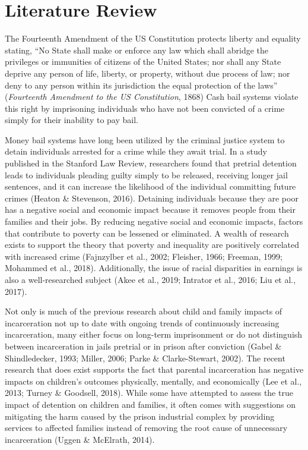\documentclass[
  letterpaper,
  DIV=11,
  numbers=noendperiod]{scrartcl}
\begin{document}
\hypertarget{literature-review}{%
\section{Literature Review}\label{literature-review}}

The Fourteenth Amendment of the US Constitution protects liberty and
equality stating, ``No State shall make or enforce any law which shall
abridge the privileges or immunities of citizens of the United States;
nor shall any State deprive any person of life, liberty, or property,
without due process of law; nor deny to any person within its
jurisdiction the equal protection of the laws'' (\emph{Fourteenth
{Amendment} to the {US Constitution}}, 1868) Cash bail systems violate
this right by imprisoning individuals who have not been convicted of a
crime simply for their inability to pay bail.

Money bail systems have long been utilized by the criminal justice
system to detain individuals arrested for a crime while they await
trial. In a study published in the Stanford Law Review, researchers
found that pretrial detention leads to individuals pleading guilty
simply to be released, receiving longer jail sentences, and it can
increase the likelihood of the individual committing future crimes
(Heaton \& Stevenson, 2016). Detaining individuals because they are poor
has a negative social and economic impact because it removes people from
their families and their jobs. By reducing negative social and economic
impacts, factors that contribute to poverty can be lessened or
eliminated. A wealth of research exists to support the theory that
poverty and inequality are positively correlated with increased crime
(Fajnzylber et al., 2002; Fleisher, 1966; Freeman, 1999; Mohammed et
al., 2018). Additionally, the issue of racial disparities in earnings is
also a well-researched subject (Akee et al., 2019; Intrator et al.,
2016; Liu et al., 2017).

Not only is much of the previous research about child and family impacts
of incarceration not up to date with ongoing trends of continuously
increasing incarceration, many either focus on long-term imprisonment or
do not distinguish between incarceration in jails pretrial or in prison
after conviction (Gabel \& Shindledecker, 1993; Miller, 2006; Parke \&
Clarke-Stewart, 2002). The recent research that does exist supports the
fact that parental incarceration has negative impacts on children's
outcomes physically, mentally, and economically (Lee et al., 2013;
Turney \& Goodsell, 2018). While some have attempted to assess the true
impact of detention on children and families, it often comes with
suggestions on mitigating the harm caused by the prison industrial
complex by providing services to affected families instead of removing
the root cause of unnecessary incarceration (Uggen \& McElrath, 2014).
\end{document}
